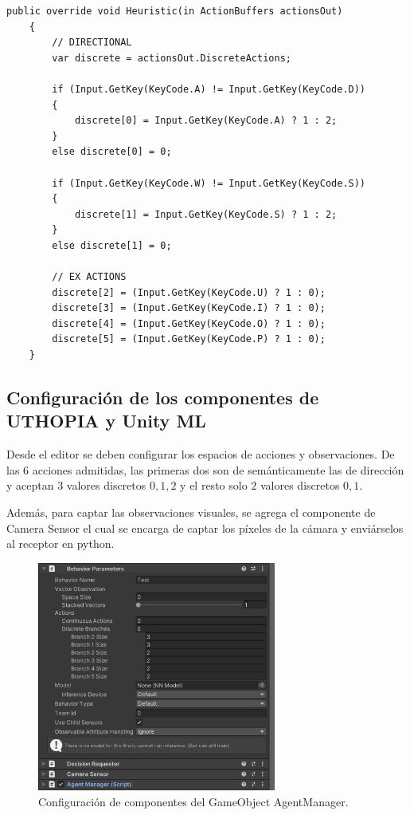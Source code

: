 \begin{lstlisting}[caption={Implementación de la asignación de acciones heurística para captar la entrada de los agentes humanos.}]
    public override void Heuristic(in ActionBuffers actionsOut)
    {
        // DIRECTIONAL
        var discrete = actionsOut.DiscreteActions;
 
        if (Input.GetKey(KeyCode.A) != Input.GetKey(KeyCode.D))
        {
            discrete[0] = Input.GetKey(KeyCode.A) ? 1 : 2;
        }
        else discrete[0] = 0;
 
        if (Input.GetKey(KeyCode.W) != Input.GetKey(KeyCode.S))
        {
            discrete[1] = Input.GetKey(KeyCode.S) ? 1 : 2;
        }
        else discrete[1] = 0;
 
        // EX ACTIONS
        discrete[2] = (Input.GetKey(KeyCode.U) ? 1 : 0);
        discrete[3] = (Input.GetKey(KeyCode.I) ? 1 : 0);
        discrete[4] = (Input.GetKey(KeyCode.O) ? 1 : 0);
        discrete[5] = (Input.GetKey(KeyCode.P) ? 1 : 0);
    }
\end{lstlisting} 
 
\subsection{Configuración de los componentes de UTHOPIA y Unity ML}
 
Desde el editor se deben configurar los espacios de acciones y observaciones. De las $6$ acciones admitidas, las primeras dos son de semánticamente las de dirección y aceptan $3$ valores discretos ${{0,1,2}}$ y el resto solo $2$ valores discretos ${{0,1}}$.
 
Además, para captar las observaciones visuales, se agrega el componente de Camera Sensor el cual se encarga de captar los píxeles de la cámara y enviárselos al receptor en python.
 
\begin{figure}[ht!]
    \centering
    \includegraphics[width=0.7\textwidth]{Graphics/unity_editor.png}
    \caption{Configuración de componentes del GameObject AgentManager.}
    \label{fig:unity-editor-1}
\end{figure}
 
